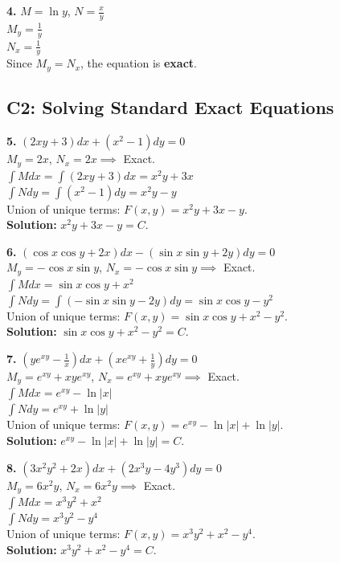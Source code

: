 \documentclass[11pt]{article}
\begin{document}
\vspace{0.5cm}
\textbf{4.} $M = \ln y$, $N = \frac{x}{y}$ \\
$M_y = \frac{1}{y}$ \\
$N_x = \frac{1}{y}$ \\
Since $M_y = N_x$, the equation is \textbf{exact}.

\subsection*{C2: Solving Standard Exact Equations}

\textbf{5.} $(2xy + 3) dx + (x^2 - 1) dy = 0$ \\
$M_y = 2x$, $N_x = 2x \implies$ Exact. \\
$\int M dx = \int (2xy + 3) dx = x^2 y + 3x$ \\
$\int N dy = \int (x^2 - 1) dy = x^2 y - y$ \\
Union of unique terms: $F(x,y) = x^2 y + 3x - y$. \\
\textbf{Solution:} $x^2 y + 3x - y = C$.

\vspace{0.5cm}
\textbf{6.} $(\cos x \cos y + 2x) dx - (\sin x \sin y + 2y) dy = 0$ \\
$M_y = -\cos x \sin y$, $N_x = -\cos x \sin y \implies$ Exact. \\
$\int M dx = \sin x \cos y + x^2$ \\
$\int N dy = \int (-\sin x \sin y - 2y) dy = \sin x \cos y - y^2$ \\
Union of unique terms: $F(x,y) = \sin x \cos y + x^2 - y^2$. \\
\textbf{Solution:} $\sin x \cos y + x^2 - y^2 = C$.

\vspace{0.5cm}
\textbf{7.} $\left(y e^{xy} - \frac{1}{x}\right) dx + \left(x e^{xy} + \frac{1}{y}\right) dy = 0$ \\
$M_y = e^{xy} + xye^{xy}$, $N_x = e^{xy} + xye^{xy} \implies$ Exact. \\
$\int M dx = e^{xy} - \ln|x|$ \\
$\int N dy = e^{xy} + \ln|y|$ \\
Union of unique terms: $F(x,y) = e^{xy} - \ln|x| + \ln|y|$. \\
\textbf{Solution:} $e^{xy} - \ln|x| + \ln|y| = C$.

\vspace{0.5cm}
\textbf{8.} $(3x^2 y^2 + 2x) dx + (2x^3 y - 4y^3) dy = 0$ \\
$M_y = 6x^2 y$, $N_x = 6x^2 y \implies$ Exact. \\
$\int M dx = x^3 y^2 + x^2$ \\
$\int N dy = x^3 y^2 - y^4$ \\
Union of unique terms: $F(x,y) = x^3 y^2 + x^2 - y^4$. \\
\textbf{Solution:} $x^3 y^2 + x^2 - y^4 = C$.
\end{document}
